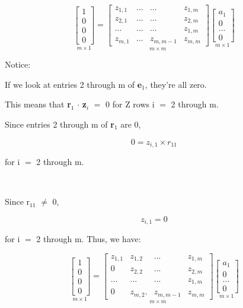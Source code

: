 \documentclass[12pt]{article}
\newcommand{\mt}[1]{\ensuremath{#1}}
\newcommand{\eql}{\mt{=} }
\newcommand{\uw}[2]{#1\mt{_{#2}}}
\begin{document}
\begin{displaymath}
  \underset{m \times 1}{
\begin{bmatrix}
     1  \\
     0 \\
     0 \\
     0
  \end{bmatrix}
} 
= \underset{m \times m}{
\begin{bmatrix}
     z_{1,1} & ... & ... & z_{1,m} \\
     z_{2,1} & ... & ... & z_{2,m} \\
     ... & ... & ... & z_{1,m} \\
     z_{m,1} & ... & z_{m,m-1} & z_{m,m} 
  \end{bmatrix}
}
\underset{m \times 1}{
\begin{bmatrix}
     a_{1} \\
     0 \\
     ... \\
     0 
  \end{bmatrix} 
} 
\end{displaymath}

Notice:

If we look at entries 2 through m of \uw{\textbf{e}}{1}, they're all zero.

This means that \uw{\textbf{r}}{1} $\cdot$ \uw{\textbf{z}}{i} $=$ 0 for Z rows i \eql 2 through m.

Since entries 2 through m of \uw{\textbf{r}}{1} are 0,

\begin{displaymath}
  0 = z_{i,1} \times r_{11}
\end{displaymath}

for i \eql 2 through m.

\

Since \uw{r}{11} $\neq$ 0, 

\begin{displaymath}
  z_{i,1} = 0
\end{displaymath}

for i \eql 2 through m. Thus, we have:

\begin{displaymath}
  \underset{m \times 1}{
\begin{bmatrix}
     1  \\
     0 \\
     0 \\
     0
  \end{bmatrix}
} 
= \underset{m \times m}{
\begin{bmatrix}
     z_{1,1} & z_{1,2}  & ... & z_{1,m} \\
     0 & z_{2,2}  & ... & z_{2,m} \\
     ... & ...  & ... & z_{1,m} \\
     0 & z_{m,2} . & z_{m,m-1} & z_{m,m} 
  \end{bmatrix}
}
\underset{m \times 1}{
\begin{bmatrix}
     a_{1} \\
     0 \\
     ... \\
     0 
  \end{bmatrix} 
} 
\end{displaymath}
\end{document}
